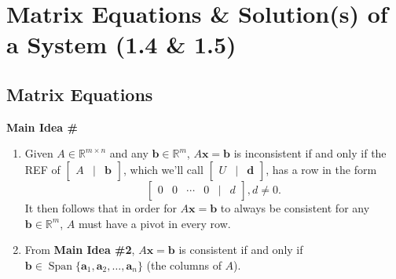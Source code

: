 \documentclass[titlepage, a4paper, 10pt]{article}
\renewcommand{\vec}[1]{\mathbf{#1}}
\DeclareMathOperator{\vspan}{Span}
\newcounter{mainideas}
\newcommand{\mainidea}{\textbf{Main Idea \#\themainideas \stepcounter{mainideas}}}
\newenvironment{mideea}[1]
{%
\begin{lrbox}{\mybox}%
	\begin{minipage}{#1\textwidth}
		{\centering \mainidea \par}

}
{\end{minipage}\end{lrbox}\begin{center}\fbox{\usebox{\mybox}}\end{center}}
\begin{document}
\section{\centering Matrix Equations \& Solution(s) of a System (1.4 \& 1.5)}
\subsection{Matrix Equations}
\begin{mideea}{0.9}
\begin{enumerate}
\item Given \(A \in \mathbb{R}^{m \times n}\) and any \(\vec{b} \in \mathbb{R}^m\), \(A\vec{x} = \vec{b}\) is inconsistent if and only if the REF of 
\(\begin{bmatrix}A & | & \vec{b}\end{bmatrix}\), which we'll call \(\begin{bmatrix}U & | & \vec{d}\end{bmatrix}\), has a row in the form 
\[\begin{bmatrix}0 & 0 & \cdots & 0 & | & d\end{bmatrix}, d \ne 0.\] It then follows that in order for \(A\vec{x} = \vec{b}\) to always be consistent for any 
\(\vec{b} \in \mathbb{R}^m\), \(A\) must have a pivot in every row.

\item From \textbf{Main Idea \#2}, \(A\vec{x} = \vec{b}\) is consistent if and only if \(\vec{b} \in \vspan\{\vec{a}_1, \vec{a}_2, \dots, \vec{a}_n\}\) (the 
columns  of \(A\)).
\end{enumerate}
\end{mideea}
\end{document}
